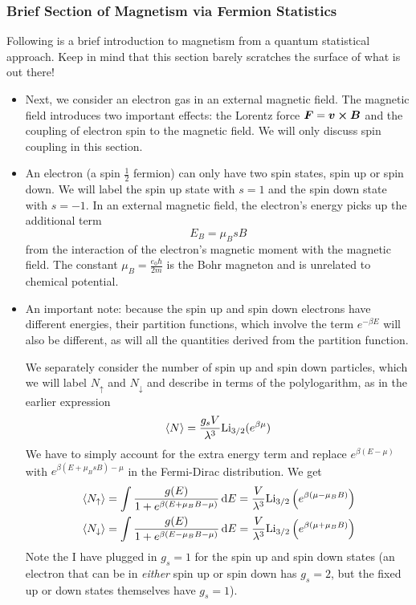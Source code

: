 \documentclass[11pt, a4paper]{article}
\newcommand{\diff}{\mathop{}\!\mathrm{d}} %
\begin{document}
\subsubsection{Brief Section of Magnetism via Fermion Statistics}
Following is a brief introduction to magnetism from a quantum statistical approach. Keep in mind that this section barely scratches the surface of what is out there!
\begin{itemize}
	\item Next, we consider an electron gas in an external magnetic field. The magnetic field introduces two important effects: the Lorentz force $ \bm{F} = \bm{v} \cross \bm{B} $ and the coupling of electron spin to the magnetic field. We will only discuss spin coupling in this section.
	
	\item An electron (a spin $ \frac{1}{2} $ fermion) can only have two spin states, spin up or spin down. We will label the spin up state with $ s = 1 $ and the spin down state with $ s = -1 $. In an external magnetic field, the electron's energy picks up the additional term
	\begin{equation*}
		E_{B} = \mu_{B} s B
	\end{equation*}
	from the interaction of the electron's magnetic moment with the magnetic field. The constant $ \mu_{B} = \frac{e_{0}\hbar}{2m} $ is the Bohr magneton and is unrelated to chemical potential.
	
	\item An important note: because the spin up and spin down electrons have different energies, their partition functions, which involve the term $ e^{-\beta E} $ will also be different, as will all the quantities derived from the partition function. 
	
	We separately consider the number of spin up and spin down particles, which we will label $ N_{\uparrow} $ and $ N_{\downarrow} $ and describe in terms of the polylogarithm, as in the earlier expression
	\begin{equation*}
		\expval{N} = \frac{g_{s}V}{\lambda^{3}}\mathrm{Li}_{3/2}(e^{\beta \mu})
	\end{equation*}
	We have to simply account for the extra energy term and replace $ e^{\beta(E - \mu)} $ with $ e^{\beta(E + \mu_{B}sB) - \mu} $ in the Fermi-Dirac distribution. We get
	\begin{align*}
		&\expval{N_{\uparrow}} = \int  \frac{g(E)}{1 + e^{\beta (E + \mu_{B}B - \mu)}}  \diff E = \frac{V}{\lambda^{3}}\mathrm{Li}_{3/2}\left (e^{\beta(\mu - \mu_{B}B)}\right )\\
		&\expval{N_{\downarrow}} = \int  \frac{g(E)}{1 + e^{\beta (E - \mu_{B}B - \mu)}}  \diff E =  \frac{V}{\lambda^{3}}\mathrm{Li}_{3/2}\left (e^{\beta(\mu + \mu_{B}B)}\right )
	\end{align*}
	Note the I have plugged in $ g_{s} = 1 $ for the spin up and spin down states (an electron that can be in \textit{either} spin up or spin down has $ g_{s} = 2$, but the fixed up or down states themselves have $ g_{s} = 1 $).
	

\end{itemize}
\end{document}
